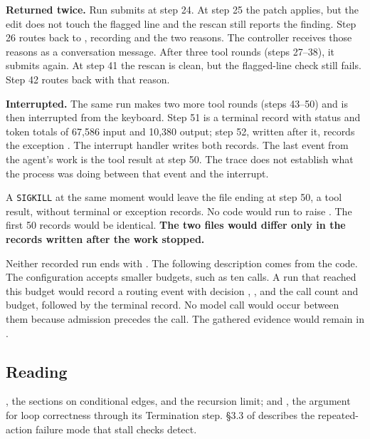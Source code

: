 \item \textbf{Returned twice.} Run  submits at step 24. At step 25 the patch
applies, but the edit does not touch the flagged line and the rescan still reports the finding. Step
26 routes back to , recording  and the two reasons.
The controller receives those reasons as a conversation message. After three tool rounds
(steps 27--38), it submits again. At step 41 the rescan is clean, but the flagged-line check still
fails. Step 42 routes back with that reason.

\item \textbf{Interrupted.} The same run makes two more tool rounds (steps 43--50) and is then
interrupted from the keyboard. Step 51 is a terminal record with status  and token
totals of 67,586 input and 10,380 output; step 52, written after it, records the exception
. The interrupt handler writes both records. The last event from the
agent's work is the tool result at step 50. The trace does not establish what the process was
doing between that event and the interrupt.

\ei

A \texttt{SIGKILL} at the same moment would leave the file ending at step 50, a tool result,
without terminal or exception records. No code would run to raise .
The first 50 records would be identical. \textbf{The two files would differ only in the records
written after the work stopped.}

Neither recorded run ends with . The following description comes from
the code. The configuration accepts smaller budgets, such as ten calls. A run that reached this
budget would record a routing event with decision
, , and the call count and budget, followed by the
terminal record. No model call would occur between them because admission precedes the call.
The gathered evidence would remain in .

\subsection{Reading}

\citet{langgraph-graph-api}, the sections on conditional edges,  and the
recursion limit; and \citet{cornell-cs2112-loopinv}, the argument for loop correctness through its
Termination step. \S3.3 of \citet{yao2023react} describes the repeated-action failure mode that
stall checks detect.

